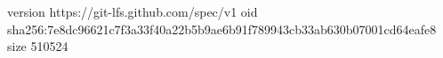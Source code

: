 version https://git-lfs.github.com/spec/v1
oid sha256:7e8dc96621c7f3a33f40a22b5b9ae6b91f789943cb33ab630b07001cd64eafe8
size 510524
